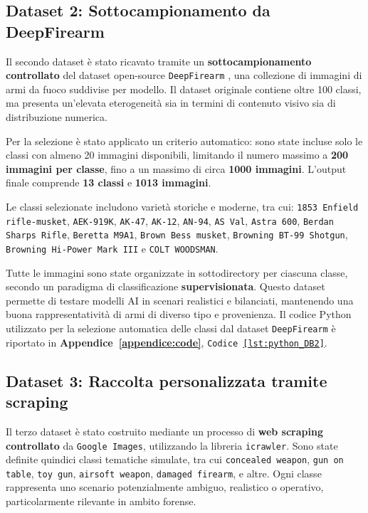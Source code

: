 \subsection*{Dataset 2: Sottocampionamento da DeepFirearm}
Il secondo dataset è stato ricavato tramite un \textbf{sottocampionamento controllato} del dataset open-source \texttt{DeepFirearm} \cite{Hao2018DeepFirearm}, una collezione di immagini di armi da fuoco suddivise per modello. Il dataset originale contiene oltre 100 classi, ma presenta un'elevata eterogeneità sia in termini di contenuto visivo sia di distribuzione numerica.

Per la selezione è stato applicato un criterio automatico: sono state incluse solo le classi con almeno 20 immagini disponibili, limitando il numero massimo a \textbf{200 immagini per classe}, fino a un massimo di circa \textbf{1000 immagini}. L’output finale comprende \textbf{13 classi} e \textbf{1013 immagini}.

Le classi selezionate includono varietà storiche e moderne, tra cui: \texttt{1853 Enfield rifle-musket}, \texttt{AEK-919K}, \texttt{AK-47}, \texttt{AK-12}, \texttt{AN-94}, \texttt{AS Val}, \texttt{Astra 600}, \texttt{Berdan Sharps Rifle}, \texttt{Beretta M9A1}, \texttt{Brown Bess musket}, \texttt{Browning BT-99 Shotgun}, \texttt{Browning Hi-Power Mark III} e \texttt{COLT WOODSMAN}.

Tutte le immagini sono state organizzate in sottodirectory per ciascuna classe, secondo un paradigma di classificazione \textbf{supervisionata}. Questo dataset permette di testare modelli AI in scenari realistici e bilanciati, mantenendo una buona rappresentatività di armi di diverso tipo e provenienza.
Il codice Python utilizzato per la selezione automatica delle classi dal dataset \texttt{DeepFirearm} è riportato in \textbf{Appendice~\ref{appendice:code}}, \texttt{Codice~\ref{lst:python_DB2}}.





\subsection*{Dataset 3: Raccolta personalizzata tramite scraping}
Il terzo dataset è stato costruito mediante un processo di \textbf{web scraping controllato} da \texttt{Google Images}, utilizzando la libreria \texttt{icrawler}. Sono state definite quindici classi tematiche simulate, tra cui \texttt{concealed weapon}, \texttt{gun on table}, \texttt{toy gun}, \texttt{airsoft weapon}, \texttt{damaged firearm}, e altre. Ogni classe rappresenta uno scenario potenzialmente ambiguo, realistico o operativo, particolarmente rilevante in ambito forense.

